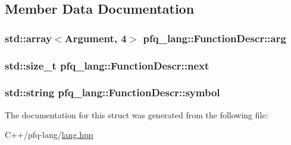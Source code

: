 \subsection{Member Data Documentation}
\hypertarget{structpfq__lang_1_1FunctionDescr_a30060a300e3162c65b2bcaf8bde97709}{
\subsubsection[{arg}]{\setlength{\rightskip}{0pt plus 5cm}std\+::array$<${\bf Argument}, 4$>$ pfq\+\_\+lang\+::\+Function\+Descr\+::arg}}\label{structpfq__lang_1_1FunctionDescr_a30060a300e3162c65b2bcaf8bde97709}
\hypertarget{structpfq__lang_1_1FunctionDescr_abe5a252468a64ff545c4a17b05650744}{
\subsubsection[{next}]{\setlength{\rightskip}{0pt plus 5cm}std\+::size\+\_\+t pfq\+\_\+lang\+::\+Function\+Descr\+::next}}\label{structpfq__lang_1_1FunctionDescr_abe5a252468a64ff545c4a17b05650744}
\hypertarget{structpfq__lang_1_1FunctionDescr_a58a21262184201b670246fdfdf0cef92}{
\subsubsection[{symbol}]{\setlength{\rightskip}{0pt plus 5cm}std\+::string pfq\+\_\+lang\+::\+Function\+Descr\+::symbol}}\label{structpfq__lang_1_1FunctionDescr_a58a21262184201b670246fdfdf0cef92}


The documentation for this struct was generated from the following file\+:\begin{DoxyCompactItemize}
\item 
C++/pfq-\/lang/\hyperlink{lang_8hpp}{lang.\+hpp}\end{DoxyCompactItemize}
